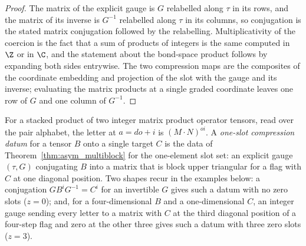 \begin{proof}
    \leanok
    The matrix of the explicit gauge is $G$ relabelled along $\tau$ in its
    rows, and the matrix of its inverse is $G^{-1}$ relabelled along $\tau$
    in its columns, so conjugation is the stated matrix conjugation followed
    by the relabelling. Multiplicativity of the coercion is the fact that a
    sum of products of integers is the same computed in $\Z$ or in $\C$, and
    the statement about the bond-space product follows by expanding both
    sides entrywise. The two compression maps are the composites of the
    coordinate embedding and projection of the slot with the gauge and its
    inverse; evaluating the matrix products at a single graded coordinate
    leaves one row of $G$ and one column of $G^{-1}$.
\end{proof}

\begin{definition}%
    \label{def:asymex_one_slot}
    \leanok
    For a stacked product of two integer matrix product operator tensors,
    read over the pair alphabet, the letter at $a=do+i$ is
    $(M\mathbin{\cdot}N)^{oi}$. A \emph{one-slot compression datum} for a
    tensor $B$ onto a single target $C$ is the data of
    Theorem~\ref{thm:asym_multiblock} for the one-element slot set: an
    explicit gauge $(\tau,G)$ conjugating $B$ into a matrix that is block
    upper triangular for a flag with $C$ at one diagonal position. Two
    shapes recur in the examples below: a conjugation $GB^iG^{-1}=C^i$ for
    an invertible $G$ gives such a datum with no zero slots ($z=0$); and,
    for a four-dimensional $B$ and a one-dimensional $C$, an integer gauge
    sending every letter to a matrix with $C$ at the third diagonal
    position of a four-step flag and zero at the other three gives such a
    datum with three zero slots ($z=3$).
\end{definition}

